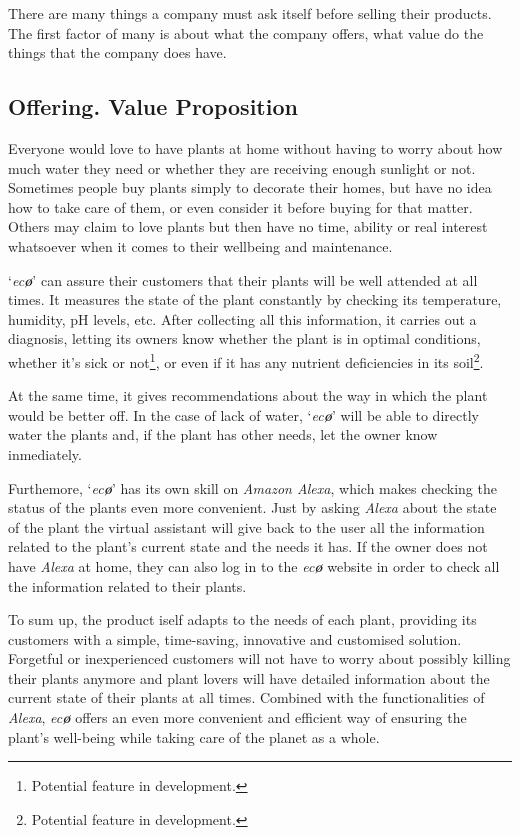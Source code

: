 \documentclass[english,runningheads,a4paper]{llncs}[2018/03/10]
\begin{document}
There are many things a company must ask itself before selling their products.
The first factor of many is about what the company offers, what value do the
things that the company does have.


    \subsection*{Offering. Value Proposition}

    Everyone would love to have plants at home without having to worry about how
    much water they need or whether they are receiving enough sunlight or not.
    Sometimes people buy plants simply to decorate their homes, but have no idea
    how to take care of them, or even consider it before buying for that matter.
    Others may claim to love plants but then have no time, ability or real
    interest whatsoever when it comes to their wellbeing and maintenance.

    `\textit{ec{\textbf{\o}}}' can assure their customers that their plants will
    be well attended at all times. It measures the state of the plant constantly
    by checking its temperature, humidity, pH levels, etc. After collecting all
    this information, it carries out a diagnosis, letting its owners know
    whether the plant is in optimal conditions, whether it's sick or
    not\footnote{Potential feature in development.}, or even if it has any
    nutrient deficiencies in its soil\footnote{Potential feature in
    development.}.

    At the same time, it gives recommendations about the way in which the plant
    would be better off. In the case of lack of water, `\textit{ec\textbf{\o}}'
    will be able to directly water the plants and, if the plant has other needs,
    let the owner know inmediately.

    Furthemore, `\textit{ec\textbf{\o}}' has its own skill on \textit{Amazon
    Alexa}, which makes checking the status of the plants even more convenient.
    Just by asking \textit{Alexa} about the state of the plant the virtual
    assistant will give back to the user all the information related to the
    plant's current state and the needs it has. If the owner does not have
    \textit{Alexa} at home, they can also log in to the \textit{ec\textbf{\o}}
    website in order to check all the information related to their plants.

    To sum up, the product iself adapts to the needs of each plant, providing
    its customers with a simple, time-saving, innovative and customised
    solution. Forgetful or inexperienced customers will not have to worry about
    possibly killing their plants anymore and plant lovers will have detailed
    information about the current state of their plants at all times. Combined
    with the functionalities of \textit{Alexa}, \textit{ec\textbf{\o}} offers an
    even more convenient and efficient way of ensuring the plant's well-being
    while taking care of the planet as a whole.
\end{document}

